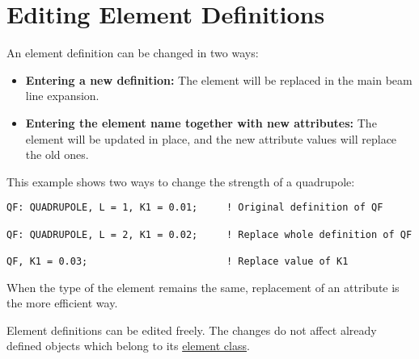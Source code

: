 
\section{Editing Element Definitions}  

An element definition can be changed in two ways: 
\begin{itemize}
   \item \textbf{Entering a new definition:} The element will be
     replaced in the main beam line expansion.  
   \item \textbf{Entering the element name together with new
     attributes:} The element will be updated in place, and the new
     attribute values will replace the old ones.  
\end{itemize} 

This example shows two ways to change the strength of a quadrupole: 
\begin{verbatim}
QF: QUADRUPOLE, L = 1, K1 = 0.01;     ! Original definition of QF

QF: QUADRUPOLE, L = 2, K1 = 0.02;     ! Replace whole definition of QF

QF, K1 = 0.03;                        ! Replace value of K1
\end{verbatim} 

When the type of the element remains the same, replacement of an
attribute is the more efficient way.  

Element definitions can be edited freely. The changes do not affect
already defined objects which belong to its
\href{elm_class.html}{element class}.  

